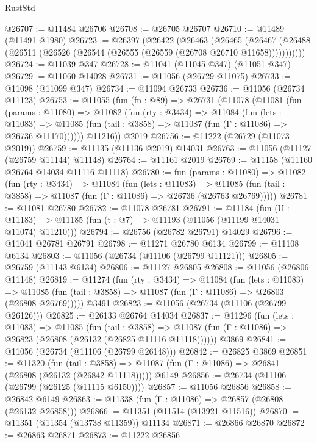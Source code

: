 \begin{lexlean}{RustStd}
\begin{coremodule}
@26707 := @11484 @26706
@26708 := @26705 @26707
@26710 := @11489 (@11491 @1980)
@26723 := @26397
    (@26422
      (@26463
        (@26465
          (@26467 (@26488 (@26511 (@26526 (@26544 (@26555 (@26559 (@26708 @26710 @11658)))))))))))
@26724 := @11039 @347
@26728 := @11041 (@11045 @347) (@11051 @347)
@26729 := @11060 @14028
@26731 := @11056 (@26729 @11075)
@26733 := @11098 (@11099 @347)
@26734 := @11094 @26733
@26736 := @11056 (@26734 @11123)
@26753 := @11055
    (fun (fn : @89) =>
    @26731
      (@11078
        (@11081
          (fun (params : @11080) =>
          @11082
            (fun (rty : @3434) =>
            @11084
              (fun (lets : @11083) =>
              @11085 (fun (tail : @3858) => @11087 (fun (Γ : @11086) => @26736 @11170))))))
        @11216))
    @2019
@26756 := @11222 (@26729 (@11073 @2019))
@26759 := @11135 (@11136 @2019) @14031
@26763 := @11056 (@11127 (@26759 @11144) @11148)
@26764 := @11161 @2019
@26769 := @11158 (@11160 @26764 @14034 @11116 @11118)
@26780 := fun (params : @11080) =>
  @11082
    (fun (rty : @3434) =>
    @11084
      (fun (lets : @11083) =>
      @11085 (fun (tail : @3858) => @11087 (fun (Γ : @11086) => @26736 (@26763 @26769)))))
@26781 := @11081 @26780
@26782 := @11078 @26781
@26791 := @11184
    (fun (U : @11183) => @11185 (fun (t : @7) => @11193 (@11056 (@11199 @14031 @11074) @11210)))
@26794 := @26756 (@26782 @26791) @14029
@26796 := @11041 @26781 @26791
@26798 := @11271 @26780 @6134
@26799 := @11108 @6134
@26803 := @11056 (@26734 (@11106 (@26799 @11121)))
@26805 := @26759 (@11143 @6134)
@26806 := @11127 @26805
@26808 := @11056 (@26806 @11148)
@26819 := @11274
    (fun (rty : @3434) =>
    @11084
      (fun (lets : @11083) =>
      @11085 (fun (tail : @3858) => @11087 (fun (Γ : @11086) => @26803 (@26808 @26769)))))
    @3491
@26823 := @11056 (@26734 (@11106 (@26799 @26126)))
@26825 := @26133 @26764 @14034
@26837 := @11296
    (fun (lets : @11083) =>
    @11085
      (fun (tail : @3858) =>
      @11087 (fun (Γ : @11086) => @26823 (@26808 (@26132 (@26825 @11116 @11118))))))
    @3869
@26841 := @11056 (@26734 (@11106 (@26799 @26148)))
@26842 := @26825 @3869
@26851 := @11320
    (fun (tail : @3858) => @11087 (fun (Γ : @11086) => @26841 (@26808 (@26132 (@26842 @11118)))))
    @6149
@26856 := @26734 (@11106 (@26799 (@26125 (@11115 @6150))))
@26857 := @11056 @26856
@26858 := @26842 @6149
@26863 := @11338 (fun (Γ : @11086) => @26857 (@26808 (@26132 @26858)))
@26866 := @11351 (@11514 (@13921 @11516))
@26870 := @11351 (@11354 (@13738 @11359)) @11134
@26871 := @26866 @26870
@26872 := @26863 @26871
@26873 := @11222 @26856

\end{coremodule}
\end{lexlean}
